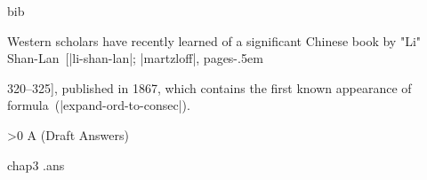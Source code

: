 
\def\chapno{X} \def\chaptitle{Experimental Pages for Concrete Math}
\def\ansnoX{\ansno X}
 bib
\def\source{\smallskip\noindent{\bf Source: }}


\noindent
\g Western scholars have recently learned of a significant Chinese
book by "Li" Shan-Lan~[|li-shan-lan|; |martzloff|, pages\kern-.5em\null\par
320--325],
published in 1867, which contains
the first known appearance of formula~\eq(|expand-ord-to-consec|).\g


\immediate\closeout\ans
\vfill
{}\eject
\parindent=30pt
\ifnum\excount>0 \beginsection A (Draft Answers)

 chap3
  \jobname.ans \fi
\bye

